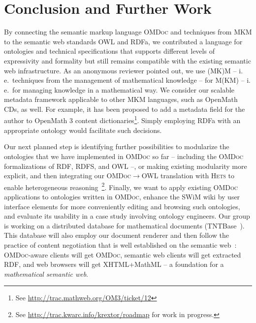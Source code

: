 \documentclass{llncs}
\renewcommand{\omdoc}{\textsc{OMDoc}\xspace}
\begin{document}
\section{Conclusion and Further Work}
\label{sec:conclusion}

By connecting the semantic markup language \omdoc and techniques from MKM to the semantic
web standards OWL and RDFa, we contributed a language for ontologies and technical
specifications that supports different levels of expressivity and formality but still
remains compatible with the existing semantic web infrastructure.  As an anonymous
reviewer pointed out, we use (MK)M -- i.\,e.\ techniques from the management of
mathematical knowledge -- for M(KM) -- i.\,e.\ for managing knowledge in a mathematical
way.  We consider our scalable metadata framework applicable to other MKM
languages\ifpublic, such as OpenMath CDs, \else\fi as well.  For example, it has been
proposed to add a metadata field for the author to OpenMath 3 content
dictionaries\footnote{See \url{http://trac.mathweb.org/OM3/ticket/12}}. Simply employing
RDFa with an appropriate ontology would facilitate such decisions.

Our next planned step is identifying further possibilities to modularize the ontologies
that we have implemented in \omdoc so far -- including the \omdoc formalizations of RDF,
RDFS, and OWL --, or making existing modularity more explicit, and then integrating our
\omdoc{}$\to$OWL translation with \textsc{Hets} to enable heterogeneous
reasoning~\cite{KutzEtAl:OWL-CASL08}\footnote{See
  \url{http://trac.kwarc.info/krextor/roadmap} for work in progress.}.  Finally, we want
to apply existing \omdoc applications to ontologies written in \omdoc, enhance the SWiM
wiki by user interface elements for more conveniently editing and browsing such
ontologies, and evaluate its usability in a case study involving ontology engineers.  Our
group is working on a distributed database for mathematical documents
(TNTBase~\cite{TNTBase:webpage}).  This database will also employ our document renderer
and then follow the practice of content negotiation that is well established on the
semantic web~\cite{W3C:CoolURIs}: {\omdoc}-aware clients will get \omdoc, semantic web
clients will get extracted RDF, and web browsers will get XHTML+MathML -- a foundation for
a \emph{mathematical semantic web}.

\ifpublic
\else
{}
\end{document}
